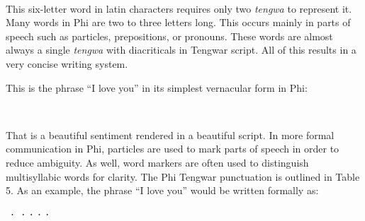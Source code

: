 \bigskip
\leftskip=0.66in
\ttbig  \normalfont
\bigskip

\leftskip=0in
This six-letter word in latin characters requires only two \emph{tengwa} to represent it. Many words in Phi are two to three letters long. This occurs mainly in parts of speech such as particles, prepositions, or pronouns. These words are almost always a single \emph{tengwa} with diacriticals in Tengwar script. All of this results in a very concise writing system.

This is the phrase “I love you” in its simplest vernacular form in Phi:

\bigskip
\leftskip=0.66in
\ttbig  \normalfont
\bigskip

\leftskip=0in
That is a beautiful sentiment rendered in a beautiful script. In more formal communication in Phi, particles are used to mark parts of speech in order to reduce ambiguity. As well, word markers are often used to distinguish multisyllabic words for clarity. The Phi Tengwar punctuation is outlined in Table 5. As an example, the phrase “I love you” would be written formally as:

\bigskip
\leftskip=0.66in
\ttbig ⸱⸱⸱⸱⸱ \normalfont
\leftskip=0in
